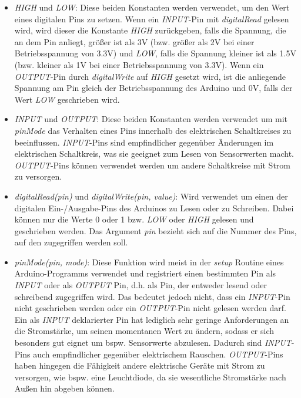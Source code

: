 \begin{itemize}
    \item \textit{HIGH} und \textit{LOW}: Diese beiden Konstanten werden verwendet, um den Wert eines digitalen Pins zu setzen. Wenn ein \textit{INPUT}-Pin mit \textit{digitalRead} gelesen wird, wird dieser die Konstante \textit{HIGH} zurückgeben, falls die Spannung, die an dem Pin anliegt, größer ist als 3V (bzw. größer als 2V bei einer Betriebsspannung von 3.3V) und \textit{LOW}, falls die Spannung kleiner ist als 1.5V (bzw. kleiner als 1V bei einer Betriebsspannung von 3.3V). Wenn ein \textit{OUTPUT}-Pin durch \textit{digitalWrite} auf \textit{HIGH} gesetzt wird, ist die anliegende Spannung am Pin gleich der Betriebsspannung des Arduino und 0V, falls der Wert \textit{LOW} geschrieben wird. 
    \item \textit{INPUT} und \textit{OUTPUT}: Diese beiden Konstanten werden verwendet um mit \textit{pinMode} das Verhalten eines Pins innerhalb des elektrischen Schaltkreises zu beeinflussen. \textit{INPUT}-Pins sind empfindlicher gegenüber Änderungen im elektrischen Schaltkreis, was sie geeignet zum Lesen von Sensorwerten macht. \textit{OUTPUT}-Pins können verwendet werden um andere Schaltkreise mit Strom zu versorgen.
    \item \textit{digitalRead(pin)} und \textit{digitalWrite(pin, value)}: Wird verwendet um einen der digitalen Ein-/Ausgabe-Pins des Arduinos zu Lesen oder zu Schreiben. Dabei können nur die Werte 0 oder 1 bzw. \textit{LOW} oder \textit{HIGH} gelesen und geschrieben werden. Das Argument \textit{pin} bezieht sich auf die Nummer des Pins, auf den zugegriffen werden soll.
    \item \textit{pinMode(pin, mode)}: Diese Funktion wird meist in der \textit{setup} Routine eines Arduino-Programms verwendet und registriert einen bestimmten Pin als \textit{INPUT} oder als \textit{OUTPUT} Pin, d.h. als Pin, der entweder lesend oder schreibend zugegriffen wird. Das bedeutet jedoch nicht, dass ein \textit{INPUT}-Pin nicht geschrieben werden oder ein \textit{OUTPUT}-Pin nicht gelesen werden darf. Ein als \textit{INPUT} deklarierter Pin hat lediglich sehr geringe Anforderungen an die Stromstärke, um seinen momentanen Wert zu ändern, sodass er sich besonders gut eignet um bspw. Sensorwerte abzulesen. Dadurch sind \textit{INPUT}-Pins auch empfindlicher gegenüber elektrischem Rauschen. \textit{OUTPUT}-Pins haben hingegen die Fähigkeit andere elektrische Geräte mit Strom zu versorgen, wie bspw. eine Leuchtdiode, da sie wesentliche Stromstärke nach Außen hin abgeben können.   

\end{itemize}
